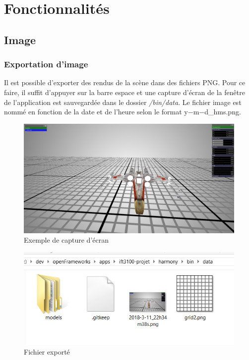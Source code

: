 \section{Fonctionnalités}
\label{s:fonctionnalités}

\subsection{Image}
\subsubsection{Exportation d'image}
\label{ss:capture_ecran}
Il est possible d'exporter des rendus de la scène dans des fichiers PNG.
Pour ce faire, il suffit d'appuyer sur la barre espace et une capture d'écran de la fenêtre de l'application est sauvegardée dans le dossier \textit{/bin/data}.
Le fichier image est nommé en fonction de la date et de l'heure selon le format y$-$m$-$d\_hms.png.

\begin{figure}[H]
    \centering
	\includegraphics[scale=0.1]{fig/2018-3-11_22h34m38s.png}
	\caption{Exemple de capture d'écran}
	\label{fig:capture_ecran}
\end{figure}

\begin{figure}[H]
    \centering
	\includegraphics[scale=0.5]{fig/preuve-capture.png}
	\caption{Fichier exporté}
	\label{fig:preuve-capture}
\end{figure}

